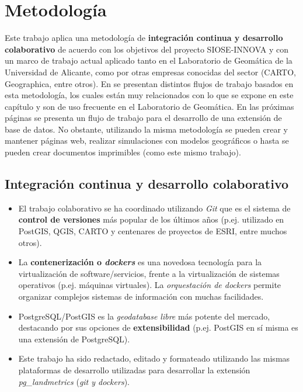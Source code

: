 

\chapter{Metodología}\label{chap:metod}

Este trabajo aplica una metodología de \textbf{integración continua y desarrollo colaborativo} de acuerdo con los objetivos del proyecto SIOSE-INNOVA y con un marco de trabajo actual aplicado tanto en el Laboratorio de Geomática de la Universidad de Alicante, como por otras empresas conocidas del sector (CARTO, Geographica, entre otros). En \citet{Zaragozi2017} se presentan distintos flujos de trabajo basados en esta metodología, los cuales están muy relacionados con lo que se expone en este capítulo y son de uso frecuente en el Laboratorio de Geomática. En las próximas páginas se presenta un flujo de trabajo para el desarrollo de una extensión de base de datos. No obstante, utilizando la misma metodología se pueden crear y mantener páginas web, realizar simulaciones con modelos geográficos o hasta se pueden crear documentos imprimibles (como este mismo trabajo).


\section{Integración continua y desarrollo colaborativo}

\begin{graybox}
\begin{itemize}
\item El trabajo colaborativo se ha coordinado utilizando \textit{Git} que es el sistema de \textbf{control de versiones} más popular de los últimos años (p.ej. utilizado en PostGIS, QGIS, CARTO y centenares de proyectos de ESRI, entre muchos otros).
\item La \textbf{contenerización o \textit{dockers}} es una novedosa tecnología para la virtualización de software/servicios, frente a la virtualización de sistemas operativos (p.ej. máquinas virtuales). La \textit{orquestación de dockers} permite organizar complejos sistemas de información con muchas facilidades.
\item PostgreSQL/PostGIS es la \textit{geodatabase libre} más potente del mercado, destacando por sus opciones de \textbf{extensibilidad} (p.ej. PostGIS en sí misma es una extensión de PostgreSQL).
\item Este trabajo ha sido redactado, editado y formateado utilizando las mismas plataformas de desarrollo utilizadas para desarrollar la extensión \textit{pg\_landmetrics} (\textit{git y dockers}).
\end{itemize}
\end{graybox}

